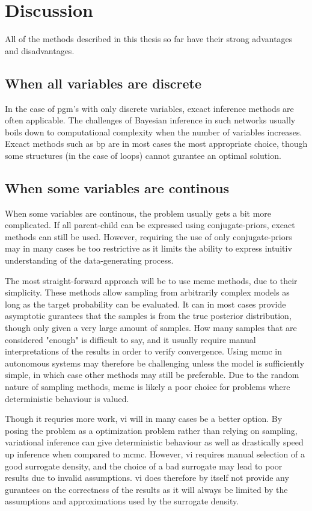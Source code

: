 \chapter{Discussion}

All of the methods described in this thesis so far have their strong advantages and disadvantages. 

\section{When all variables are discrete}
In the case of \acrshort{pgm}'s with only discrete variables, excact inference methods are often applicable. The challenges of Bayesian inference in such networks usually boils down to computational complexity when the number of variables increases. Excact methods such as \acrshort{bp} are in most cases the most appropriate choice, though some structures (in the case of loops) cannot gurantee an optimal solution. 

\section{When some variables are continous}
When some variables are continous, the problem usually gets a bit more complicated. If all parent-child can be expressed using conjugate-priors, excact methods can still be used. However, requiring the use of only conjugate-priors may in many cases be too restrictive as it limits the ability to express intuitiv understanding of the data-generating process. 

The most straight-forward approach will be to use \acrshort{mcmc} methods, due to their simplicity. These methods allow sampling from arbitrarily complex models as long as the target probability can be evaluated. It can in most cases provide asymptotic gurantees that the samples is from the true posterior distribution, though only given a very large amount of samples. How many samples that are considered "enough" is difficult to say, and it usually require manual interpretations of the results in order to verify convergence. Using \acrshort{mcmc} in autonomous systems may therefore be challenging unless the model is sufficiently simple, in which case other methods may still be preferable. Due to the random nature of sampling methods, \acrshort{mcmc} is likely a poor choice for problems where deterministic behaviour is valued.



Though it requries more work, \acrshort{vi} will in many cases be a better option. By posing the problem as a optimization problem rather than relying on sampling, variational inference can give deterministic behaviour as well as drastically speed up inference when compared to \acrshort{mcmc}. However, \acrshort{vi} requires manual selection of a good surrogate density, and the choice of a bad surrogate may lead to poor results due to invalid assumptions. \acrshort{vi} does therefore by itself not provide any gurantees on the correctness of the results as it will always be limited by the assumptions and approximations used by the surrogate density.

